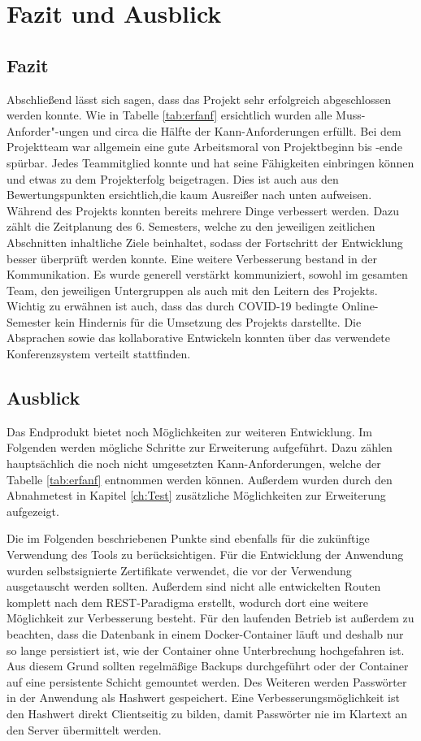 \chapter{Fazit und Ausblick}
\section{Fazit}
Abschließend lässt sich sagen, dass das Projekt sehr erfolgreich abgeschlossen werden konnte. 
Wie in Tabelle \vref{tab:erfanf} ersichtlich wurden alle Muss-Anforder"-ungen und circa die Hälfte der Kann-Anforderungen erfüllt.
Bei dem Projektteam war allgemein eine gute Arbeitsmoral von Projektbeginn bis -ende spürbar.
Jedes Teammitglied konnte und hat seine Fähigkeiten einbringen können und etwas zu dem Projekterfolg beigetragen.
Dies ist auch aus den Bewertungspunkten ersichtlich,die kaum Ausreißer nach unten aufweisen.
Während des Projekts konnten bereits mehrere Dinge verbessert werden. 
Dazu zählt die Zeitplanung des 6. Semesters, welche zu den jeweiligen zeitlichen Abschnitten inhaltliche Ziele beinhaltet, sodass der Fortschritt der Entwicklung besser überprüft werden konnte.
Eine weitere Verbesserung bestand in der Kommunikation.
Es wurde generell verstärkt kommuniziert, sowohl im gesamten Team, den jeweiligen Untergruppen als auch mit den Leitern des Projekts. 
Wichtig zu erwähnen ist auch, dass das durch COVID-19 bedingte Online-Semester kein Hindernis für die Umsetzung des Projekts darstellte.
Die Absprachen sowie das kollaborative Entwickeln konnten über das verwendete Konferenzsystem verteilt stattfinden.

\section{Ausblick}
Das Endprodukt bietet noch Möglichkeiten zur weiteren Entwicklung. 
Im Folgenden werden mögliche Schritte zur Erweiterung aufgeführt.
Dazu zählen hauptsächlich die noch nicht umgesetzten Kann-Anforderungen, welche der Tabelle \vref{tab:erfanf} entnommen werden können.
Außerdem wurden durch den Abnahmetest in Kapitel \vref{ch:Test} zusätzliche Möglichkeiten zur Erweiterung aufgezeigt.

Die im Folgenden beschriebenen Punkte sind ebenfalls für die zukünftige Verwendung des Tools zu berücksichtigen.
Für die Entwicklung der Anwendung wurden selbstsignierte Zertifikate verwendet, die vor der Verwendung ausgetauscht werden sollten.
Außerdem sind nicht alle entwickelten Routen komplett nach dem REST-Paradigma erstellt, wodurch dort eine weitere Möglichkeit zur Verbesserung besteht.
Für den laufenden Betrieb ist außerdem zu beachten, dass die Datenbank in einem Docker-Container läuft und deshalb nur so lange persistiert ist, wie der Container ohne Unterbrechung hochgefahren ist.
Aus diesem Grund sollten regelmäßige Backups durchgeführt oder der Container auf eine persistente Schicht gemountet werden. 
Des Weiteren werden Passwörter in der Anwendung als Hashwert gespeichert.
Eine Verbesserungsmöglichkeit ist den Hashwert direkt Clientseitig zu bilden, damit Passwörter nie im Klartext an den Server übermittelt werden.